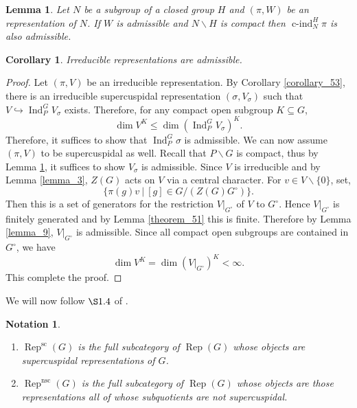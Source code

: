 \documentclass[8pt]{article}
\newtheorem{lemma}{Lemma}[section]
\newtheorem{notation}{Notation}[section]
\newtheorem{corollary}{Corollary} [section]
\DeclareMathOperator{\Ind}{Ind}
\DeclareMathOperator{\cind}{c-ind}
\DeclareMathOperator{\Rep}{Rep}
\DeclareMathOperator{\supcus}{sc}
\DeclareMathOperator{\nsc}{nsc}
\newcommand{\sep}[0]{\:|\:}
\begin{document}
\begin{lemma}
  Let $N$ be a subgroup of a closed group $H$ and $(\pi,W)$ be an representation of $N$. If $W$ is admissible and $N\backslash H$ is compact then $\cind_N^H\pi$ is also admissible.
  \label{lemma_hoemework_4_6_b}
\end{lemma}
\begin{corollary}
  \label{corollary_54}
  Irreducible representations are admissible.
\end{corollary}
\begin{proof}
  Let $(\pi,V)$ be an irreducible representation. By Corollary \ref{corollary_53}, there is an irreducible supercuspidal representation $(\sigma,V_\sigma)$ such that $V\hookrightarrow\Ind_P^G V_\sigma$ exists. Therefore, for any compact open subgroup $K\subseteq G$,
  \begin{equation*}
    \dim V^K \leq \dim(\Ind_P^GV_\sigma)^K.
  \end{equation*}
  Therefore, it suffices to show that $\Ind_P^G\sigma$ is admissible. We can now assume $(\pi,V)$ to be supercuspidal as well. Recall that $P\backslash G$ is compact, thus by Lemma \ref{lemma_hoemework_4_6_b}, it suffices to show $V_\sigma$ is admissible. 
  Since $V$ is irreducible and by Lemma \ref{lemma_3}, $Z(G)$ acts on $V$ via a central character. For $v\in V\backslash\{0\}$, set,
  \begin{equation*}
    \{\pi(g)v\sep [g]\in G/(Z(G)G^\circ)\}.
  \end{equation*}
  Then this is a set of generators for the restriction $V|_{G^\circ}$ of $V$ to $G^\circ$. Hence $V|_{G^\circ}$ is finitely generated and by Lemma \ref{theorem_51} this is finite. Therefore by Lemma \ref{lemma_9}, $V|_{G^\circ}$ is admissible. Since all compact open subgroups are contained in $G^\circ$, we have 
  \begin{equation*}
    \dim V^K=\dim (V|_{G^\circ})^K<\infty.
  \end{equation*}
  This complete the proof.
\end{proof}
We will now follow $\S1.4$ of \cite{Roche}.
\begin{notation}$\:$
  \begin{enumerate}[1).]
    \item $\Rep^{\supcus}(G)$ is the full subcategory of $\Rep(G)$ whose objects are supercuspidal representations of $G$.
    \item $\Rep^{\nsc}(G)$ is the full subcategory of $\Rep(G)$ whose objects are those representations all of whose subquotients are not supercuspidal.
  \end{enumerate}
\end{notation}
\end{document}
